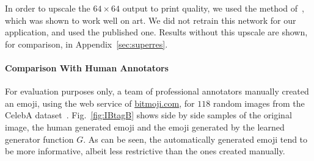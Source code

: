 \documentclass{article} %
\begin{document}
In order to upscale the $64 \times 64$ output to print quality, we used the method of~\cite{superres}, which was shown to work well on art. We did not retrain this network for our application, and used the published one. Results without this upscale are shown, for comparison, in Appendix~\ref{sec:superres}. 

\paragraph{Comparison With Human Annotators}For evaluation purposes only, a team of professional annotators manually created an emoji, using the web service of \url{bitmoji.com}, for $118$ random images from the CelebA dataset~\citep{celeba}.  Fig.~\ref{fig:IBtagB} shows side by side samples of the original image, the human generated emoji and the emoji generated by the learned generator function $G$.  As can be seen, the automatically generated emoji tend to be more informative, albeit less restrictive than the ones created manually. 
\end{document}
